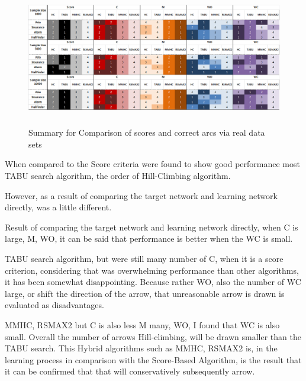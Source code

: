 	\begin{figure}[!h]
	\centering
		\includegraphics[height=170pt]{images/Real_Result}
		\caption{Summary for Comparison of scores and correct arcs via real data sets}
	\end{figure}	

When compared to the Score criteria were found to show good performance most TABU search algorithm, the order of Hill-Climbing algorithm.

However, as a result of comparing the target network and learning network directly, was a little different.

Result of comparing the target network and learning network directly, when C is large, M, WO, it can be said that performance is better when the WC is small.

TABU search algorithm, but were still many number of C, when it is a score criterion, considering that was overwhelming performance than other algorithms, it has been somewhat disappointing. Because rather WO, also the number of WC large, or shift the direction of the arrow, that unreasonable arrow is drawn is evaluated as disadvantages.

MMHC, RSMAX2 but C is also less M many, WO, I found that WC is also small. Overall the number of arrows Hill-climbing, will be drawn smaller than the TABU search. This Hybrid algorithms such as MMHC, RSMAX2 is, in the learning process in comparison with the Score-Based Algorithm, is the result that it can be confirmed that that will conservatively subsequently arrow.

